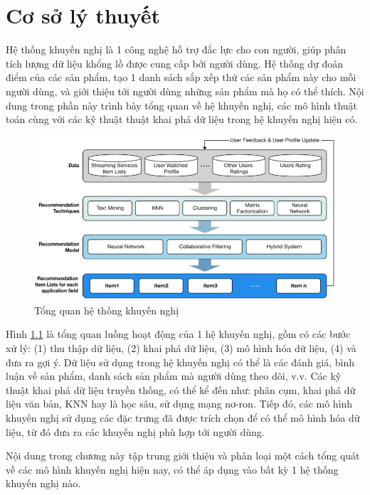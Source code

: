 \chapter{Cơ sở lý thuyết}
\label{chap2}

Hệ thống khuyến nghị là 1 công nghệ hỗ trợ đắc lực cho con người, 
giúp phân tích lượng dữ liệu khổng lồ được cung cấp bởi người dùng. 
Hệ thống dự đoán điểm của các sản phẩm, tạo 1 danh sách sắp xếp thứ các 
sản phẩm này cho mỗi người dùng, và giới thiệu tới người dùng những sản 
phẩm mà họ có thể thích. Nội dung trong phần này trình bày tổng quan về 
hệ khuyến nghị, các mô hình thuật toán cùng với các kỹ thuật thuật khai 
phá dữ liệu trong hệ khuyến nghị hiện có.
\begin{figure}[htbp]
    \centering
    \includegraphics[width=1\textwidth]{imgs/chapter_2/tong-quan-htkn.png}
    \caption{Tổng quan hệ thống khuyến nghị}
    \label{tqhtkn}
\end{figure}
Hình \ref{tqhtkn} là tổng quan 
luồng hoạt động của 1 hệ khuyến nghị, gồm có các bước xử lý: (1) thu 
thập dữ liệu, (2) khai phá dữ liệu, (3) mô hình hóa dữ liệu, (4) và 
đưa ra gợi ý. Dữ liệu sử dụng trong hệ khuyến nghị có thể là các đánh 
giá, bình luận về sản phẩm, danh sách sản phẩm mà người dùng theo dõi, 
v.v. Các kỹ thuật khai phá dữ liệu truyền thống, có thể kể đến như: 
phân cụm, khai phá dữ liệu văn bản, KNN hay là học sâu, sử dụng mạng 
nơ-ron. Tiếp đó, các mô hình khuyến nghị sử dụng các đặc trưng đã 
được trích chọn để có thể mô hình hóa dữ liệu, từ đó đưa ra các khuyến 
nghị phù hợp tới người dùng.

Nội dung trong chương này tập trung giới thiệu và phân loại một cách tổng 
quát về các mô hình khuyến nghị hiện nay, có thể áp dụng vào bất kỳ 1 hệ thống khuyến
nghị nào.

